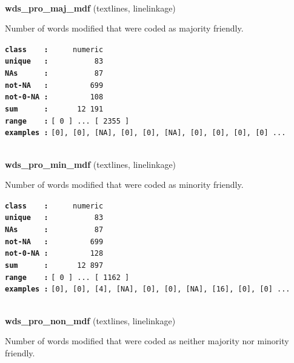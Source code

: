 \documentclass[]{article}
\begin{document}
~

\textbf{wds\_pro\_maj\_mdf} (textlines, linelinkage)

Number of words modified that were coded as majority friendly.

\textbf{\texttt{class\ \ \ \ :}} \texttt{~~~~~numeric}\\
\textbf{\texttt{unique\ \ \ :}} \texttt{~~~~~~~~~~83}\\
\textbf{\texttt{NAs\ \ \ \ \ \ :}} \texttt{~~~~~~~~~~87}\\
\textbf{\texttt{not-NA\ \ \ :}} \texttt{~~~~~~~~~699}\\
\textbf{\texttt{not-0-NA\ :}} \texttt{~~~~~~~~~108}\\
\textbf{\texttt{sum\ \ \ \ \ \ :}} \texttt{~~~~~~12~191}\\
\textbf{\texttt{range\ \ \ \ :}}
\texttt{{[}\ 0\ {]}\ ...\ {[}\ 2355\ {]}}\\
\textbf{\texttt{examples\ :}}
\texttt{{[}0{]},\ {[}0{]},\ {[}NA{]},\ {[}0{]},\ {[}0{]},\ {[}NA{]},\ {[}0{]},\ {[}0{]},\ {[}0{]},\ {[}0{]}\ ...}\\

~

\textbf{wds\_pro\_min\_mdf} (textlines, linelinkage)

Number of words modified that were coded as minority friendly.

\textbf{\texttt{class\ \ \ \ :}} \texttt{~~~~~numeric}\\
\textbf{\texttt{unique\ \ \ :}} \texttt{~~~~~~~~~~83}\\
\textbf{\texttt{NAs\ \ \ \ \ \ :}} \texttt{~~~~~~~~~~87}\\
\textbf{\texttt{not-NA\ \ \ :}} \texttt{~~~~~~~~~699}\\
\textbf{\texttt{not-0-NA\ :}} \texttt{~~~~~~~~~128}\\
\textbf{\texttt{sum\ \ \ \ \ \ :}} \texttt{~~~~~~12~897}\\
\textbf{\texttt{range\ \ \ \ :}}
\texttt{{[}\ 0\ {]}\ ...\ {[}\ 1162\ {]}}\\
\textbf{\texttt{examples\ :}}
\texttt{{[}0{]},\ {[}0{]},\ {[}4{]},\ {[}NA{]},\ {[}0{]},\ {[}0{]},\ {[}NA{]},\ {[}16{]},\ {[}0{]},\ {[}0{]}\ ...}\\

~

\textbf{wds\_pro\_non\_mdf} (textlines, linelinkage)

Number of words modified that were coded as neither majority nor
minority friendly.
\end{document}
